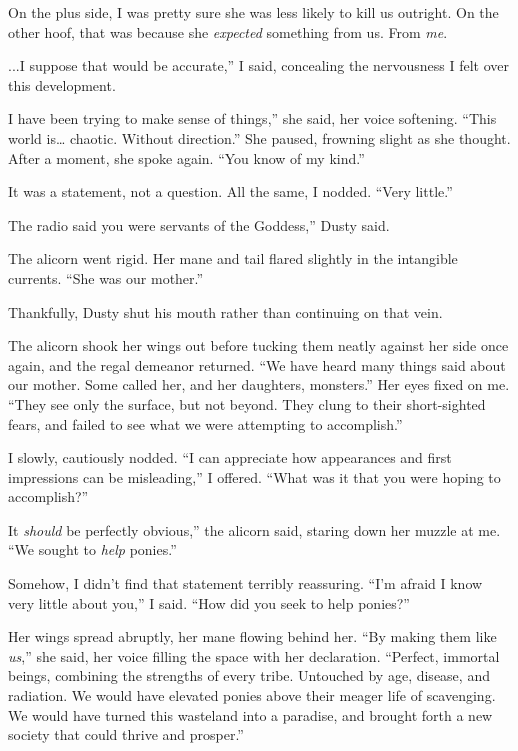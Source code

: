 On the plus side, I was pretty sure she was less likely to kill us outright. On the other hoof, that was because she \textit{expected} something from us. From \textit{me}.

\leavevmode{}...I suppose that would be accurate,” I said, concealing the nervousness I felt over this development.

\leavevmode{}I have been trying to make sense of things,” she said, her voice softening. “This world is… chaotic. Without direction.” She paused, frowning slight as she thought. After a moment, she spoke again. “You know of my kind.”

It was a statement, not a question. All the same, I nodded. “Very little.”

\leavevmode{}The radio said you were servants of the Goddess,” Dusty said.

The alicorn went rigid. Her mane and tail flared slightly in the intangible currents. “She was our mother.”

Thankfully, Dusty shut his mouth rather than continuing on that vein.

The alicorn shook her wings out before tucking them neatly against her side once again, and the regal demeanor returned. “We have heard many things said about our mother. Some called her, and her daughters, monsters.” Her eyes fixed on me. “They see only the surface, but not beyond. They clung to their short-sighted fears, and failed to see what we were attempting to accomplish.”

I slowly, cautiously nodded. “I can appreciate how appearances and first impressions can be misleading,” I offered. “What was it that you were hoping to accomplish?”

\leavevmode{}It \textit{should} be perfectly obvious,” the alicorn said, staring down her muzzle at me. “We sought to \textit{help} ponies.”

Somehow, I didn’t find that statement terribly reassuring. “I’m afraid I know very little about you,” I said. “How did you seek to help ponies?”

Her wings spread abruptly, her mane flowing behind her. “By making them like \textit{us},” she said, her voice filling the space with her declaration. “Perfect, immortal beings, combining the strengths of every tribe. Untouched by age, disease, and radiation. We would have elevated ponies above their meager life of scavenging. We would have turned this wasteland into a paradise, and brought forth a new society that could thrive and prosper.”

